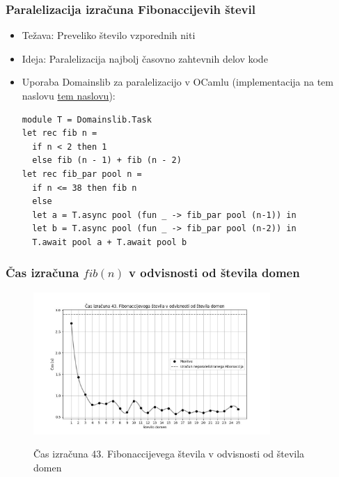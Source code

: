 \documentclass{beamer}
\begin{document}
\begin{frame}[fragile]
    \frametitle{Paralelizacija izračuna Fibonaccijevih števil}
    \begin{itemize}
        \item Težava: Preveliko število vzporednih niti
        \item Ideja: Paralelizacija najbolj časovno zahtevnih delov kode
        \item Uporaba Domainslib za paralelizacijo v OCamlu (implementacija na tem naslovu 
        \href{https://github.com/tjazerzen/parallelisation-of-graph-algorithms-in-functional-programming-languages/blob/parallel_fibonacci/playground/graph/fib.ml}{tem naslovu}):
    \begin{verbatim}
module T = Domainslib.Task
let rec fib n = 
  if n < 2 then 1 
  else fib (n - 1) + fib (n - 2)
let rec fib_par pool n =
  if n <= 38 then fib n
  else
  let a = T.async pool (fun _ -> fib_par pool (n-1)) in
  let b = T.async pool (fun _ -> fib_par pool (n-2)) in
  T.await pool a + T.await pool b
    \end{verbatim}
    \end{itemize}
\end{frame}

\begin{frame}
    \frametitle{Čas izračuna $fib(n)$ v odvisnosti od števila domen}
    \begin{figure}
        \centering
        \caption{Čas izračuna 43. Fibonaccijevega števila v odvisnosti od števila domen}
        \includegraphics[width=9cm]{slike/fib_par_v_odvisnosti_od_domen.jpg}
        \label{fig:fib_par_v_odvisnosti_od_domen}
      \end{figure}
\end{frame}
\end{document}
